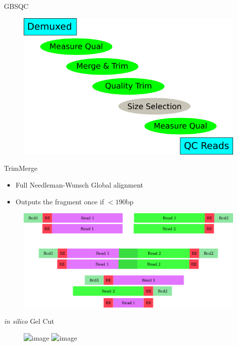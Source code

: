 \documentclass[t]{beamer}
\begin{document}
\begin{frame}{GBSQC}
  \begin{figure}[h]
    \centering
    \includegraphics[width=\textwidth]{img/qc.png}
  \end{figure}
\end{frame}

\begin{frame}{TrimMerge}
  \begin{itemize}
    \item Full Needleman-Wunsch Global alignment
    \item Outputs the fragment once if $<190$bp
  \end{itemize}
  \begin{figure}[h]
    \centering
    \includegraphics[width=\textwidth]{img/readthru.png}
  \end{figure}
\end{frame}


\begin{frame}{\textit{in silico} Gel Cut}
  \begin{figure}[h]
    \centering
    \includegraphics<1>[width=0.8\linewidth]{img/lane-effect.png}
    \includegraphics<2>[width=0.7\textwidth]{img/size-sel-hist.png}
  \end{figure}
\end{frame}
\end{document}

